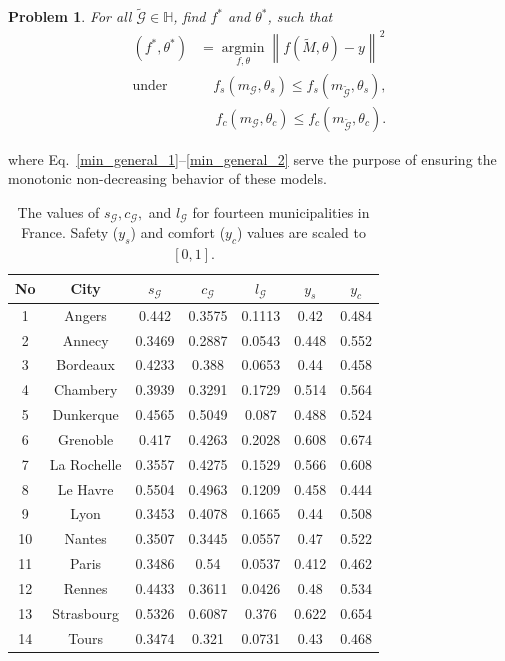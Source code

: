 \documentclass[lettersize,journal]{IEEEtran}
\newtheorem{problem}{Problem}
\begin{document}
\begin{problem} For all $\tilde{\mathcal{G}} \in \mathbb{H}$, find $f^*$ and $\theta^*$, such that
\begin{align}
\label{min_general}
       (f^{\ast}, \theta^{\ast}) &= \underset{f, \theta}{\operatorname{argmin}}  \left\|  f(\tilde{M},\theta) - y  \right\|^2 \\
    \text{under} & \label{min_general_1}   \quad f_{s}(m_{\mathcal{G}}, \theta_{s}) \leq  f_{s}(m_{\tilde{\mathcal{G}}}, \theta_{s}), \\
    & \label{min_general_2} \quad \, f_{c}(m_{\mathcal{G}}, \theta_{c}) \leq  f_{c}(m_{\tilde{\mathcal{G}}}, \theta_{c}).
\end{align}
\label{Problem1}
\end{problem}
where Eq.~\eqref{min_general_1}--\eqref{min_general_2} serve the purpose of ensuring the monotonic non-decreasing behavior of these models.
%
\begin{table}[t]
  \centering
  \vspace{0.2cm}
  \begin{tabular}{|c|c|c|c|c|c|c|}
    \hline
    \textbf{No} & \textbf{City} & ${s_{\mathcal{G}}}$ & ${c_{\mathcal{G}}}$ & ${l_{\mathcal{G}}}$ &$y_{s}$ & $y_{c}$ \\
    \hline
    1 & Angers & 0.442  & 0.3575 & 0.1113 & 0.42 & 0.484 \\
2 & Annecy & 0.3469  & 0.2887 & 0.0543 & 0.448 & 0.552 \\
3 & Bordeaux & 0.4233  & 0.388 & 0.0653 & 0.44 & 0.458 \\
4 & Chambery & 0.3939  & 0.3291 & 0.1729 & 0.514 & 0.564 \\
5 & Dunkerque & 0.4565 & 0.5049  & 0.087 & 0.488 & 0.524 \\
6 & Grenoble & 0.417  & 0.4263 & 0.2028 & 0.608 & 0.674 \\
7 & La Rochelle & 0.3557  & 0.4275 & 0.1529 & 0.566 & 0.608 \\
8 & Le Havre & 0.5504  & 0.4963 & 0.1209 & 0.458 & 0.444 \\
9 & Lyon & 0.3453  & 0.4078 & 0.1665 & 0.44 & 0.508 \\
10 & Nantes & 0.3507  & 0.3445 & 0.0557 & 0.47 & 0.522 \\
11 & Paris & 0.3486  & 0.54 & 0.0537 & 0.412 & 0.462 \\
12 & Rennes & 0.4433  & 0.3611 & 0.0426 & 0.48 & 0.534 \\
13 & Strasbourg & 0.5326  & 0.6087 & 0.376 & 0.622 & 0.654 \\
14 & Tours & 0.3474  & 0.321 & 0.0731 & 0.43 & 0.468 \\
    \hline
  \end{tabular}
  \caption{ \footnotesize The values of $s_{\mathcal{G}}, c_{\mathcal{G}},$ and $l_{\mathcal{G}}$  for fourteen municipalities in France. Safety ($y_{s}$) and comfort ($y_{c}$) values are scaled to $\left [ 0, 1 \right ]$.}
  \label{metrics_safety_comfort}
\end{table}
\end{document}
